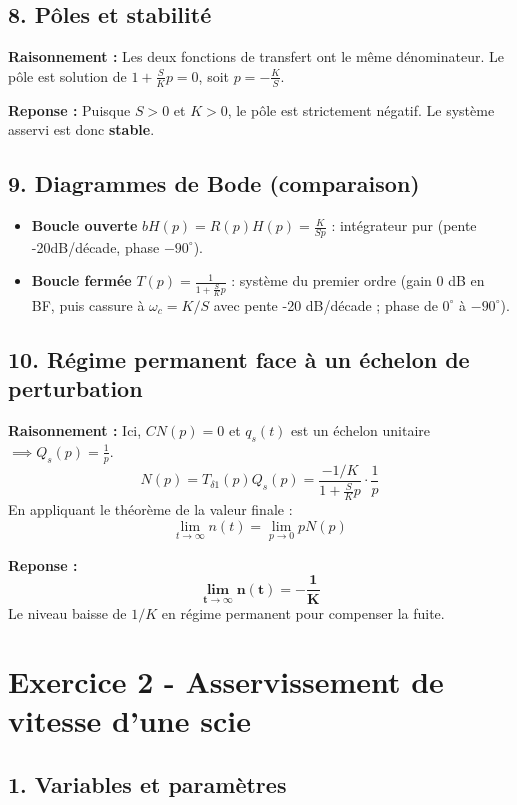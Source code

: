 \documentclass[11pt,a4paper]{article}
\begin{document}
\subsection*{8. Pôles et stabilité}

\textbf{Raisonnement :} Les deux fonctions de transfert ont le même dénominateur. Le pôle est solution de $1 + \frac{S}{K}p = 0$, soit $p = -\frac{K}{S}$.

\textbf{Reponse :} Puisque $S > 0$ et $K > 0$, le pôle est strictement négatif. Le système asservi est donc \textbf{stable}.

\subsection*{9. Diagrammes de Bode (comparaison)}

\begin{itemize}
    \item \textbf{Boucle ouverte} $bH(p) = R(p)H(p) = \frac{K}{Sp}$ : intégrateur pur (pente -20dB/décade, phase $-90^\circ$).
    \item \textbf{Boucle fermée} $T(p) = \frac{1}{1 + \frac{S}{K}p}$ : système du premier ordre (gain 0 dB en BF, puis cassure à $\omega_c = K/S$ avec pente -20 dB/décade ; phase de $0^\circ$ à $-90^\circ$).
\end{itemize}

\subsection*{10. Régime permanent face à un échelon de perturbation}

\textbf{Raisonnement :} Ici, $CN(p) = 0$ et $q_s(t)$ est un échelon unitaire $\implies Q_s(p) = \frac{1}{p}$.
$$
N(p) = T_{\delta 1}(p) Q_s(p) = \frac{-1/K}{1 + \frac{S}{K}p} \cdot \frac{1}{p}
$$
En appliquant le théorème de la valeur finale :
$$
\lim_{t \to \infty} n(t) = \lim_{p \to 0} p N(p)
$$

\textbf{Reponse :}
$$
\mathbf{\lim_{t \to \infty} n(t) = -\frac{1}{K}}
$$
Le niveau baisse de $1/K$ en régime permanent pour compenser la fuite.

\hrulefill

\section*{Exercice 2 - Asservissement de vitesse d'une scie}

\subsection*{1. Variables et paramètres}
\end{document}
